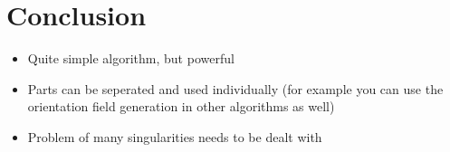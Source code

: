 \documentclass{ACGSeminar}
\begin{document}

\section{Conclusion}
\begin{itemize}
	\item	Quite simple algorithm, but powerful
	\item	Parts can be seperated and used individually (for example you can use the orientation field generation in other algorithms as well)
	\item	Problem of many singularities needs to be dealt with
\end{itemize}

\label{cha:references}
\printbibliography
\end{document}
